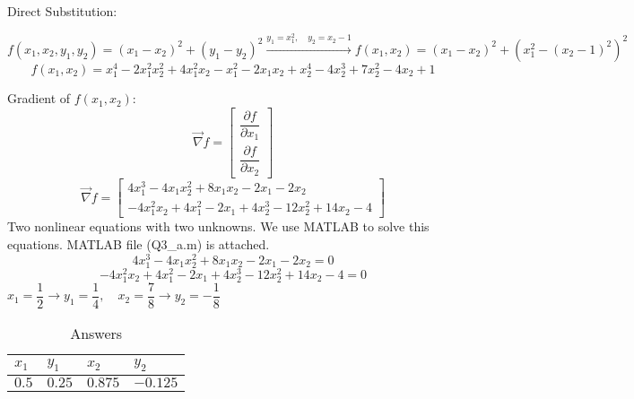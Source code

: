 Direct Substitution:



$f(x_1, x_2, y_1, y_2) = (x_1- x_2)^2 + (y_1 - y_2)^2 \xrightarrow{y_1 = x_1^2, \quad y_2 = x_2-1} f(x_1, x_2) = (x_1- x_2)^2 + (x_1^2 - (x_2-1)^2)^2$
$$f(x_1, x_2) = x_1^4 - 2x_1^2x_2^2 + 4x_1^2x_2 - x_1^2 - 2x_1x_2 + x_2^4 - 4x_2^3 + 7x_2^2 - 4x_2 + 1$$


Gradient of $f(x_1, x_2)$:
$$\vec{\nabla} f = \begin{bmatrix}
	\dfrac{\partial f}{\partial x_1} \\[6pt]
	\dfrac{\partial f}{\partial x_2}
\end{bmatrix} $$
$$\vec{\nabla} f = \begin{bmatrix}
	4x_1^3 - 4x_1x_2^2 + 8x_1x_2 - 2x_1 - 2x_2 \\
	- 4x_1^2x_2 + 4x_1^2 - 2x_1 + 4x_2^3 - 12x_2^2 + 14x_2 - 4
\end{bmatrix} $$
Two nonlinear equations with two unknowns. We use MATLAB to solve this equations. MATLAB file (Q3\_a.m) is attached.
$$	4x_1^3 - 4x_1x_2^2 + 8x_1x_2 - 2x_1 - 2x_2 =  0 $$
$$- 4x_1^2x_2 + 4x_1^2 - 2x_1 + 4x_2^3 - 12x_2^2 + 14x_2 - 4 = 0$$
$x_1 = \dfrac{1}{2} \to y_1 = \dfrac{1}{4}, \quad x_2 = \dfrac{7}{8} \to y_2 = -\dfrac{1}{8}$
\begin{table}[H]
	\caption {Answers} \label{ans} 
	\begin{center}
		\begin{tabular}{| l | l | l | l |}
			\hline
			$x_1$ & $y_1$ & $x_2$ & $y_2$ \TBstrut \\
			\hline
			$0.5$ & $0.25$ & $0.875$ & $-0.125$ \Tstrut\\
			\hline
		\end{tabular}
	\end{center}
\end{table}

